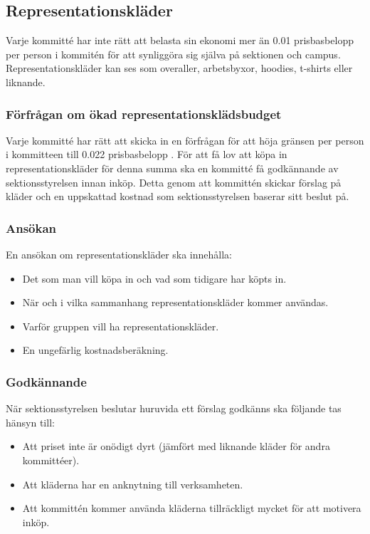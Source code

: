 \documentclass[a4paper]{dtek}
\newcommand{\prisbasbelopp}[1]{
    #1 prisbasbelopp
    \ifdef{\nuvarandeprisbasbelopp}{
        \marginpar{
            \small{ \textbf{\roundandprint{\xintiexpr#1 * \nuvarandeprisbasbelopp\relax}kr}}
        }
    }{}
}
\begin{document}
\subsection{Representationskläder}
Varje kommitté har inte rätt att belasta sin ekonomi mer än \prisbasbelopp{0.01} per person i kommitén
för att synliggöra sig själva på sektionen och campus. 
Representationskläder kan ses som overaller, arbetsbyxor, hoodies, t-shirts eller liknande.

\subsubsection{Förfrågan om ökad representationsklädsbudget}
Varje kommitté har rätt att skicka in en förfrågan för att höja gränsen
per person i kommitteen till \prisbasbelopp{0.022}.
För att få lov att köpa in representationskläder för denna summa ska en 
kommitté få godkännande av sektionsstyrelsen innan inköp. Detta genom att kommittén
skickar förslag på kläder och en uppskattad kostnad som sektionsstyrelsen baserar
sitt beslut på.

\subsubsection{Ansökan}
En ansökan om representationskläder ska innehålla:
\begin{itemize}
  \item Det som man vill köpa in och vad som tidigare har köpts in.
  \item När och i vilka sammanhang representationskläder kommer användas.
  \item Varför gruppen vill ha representationskläder.
  \item En ungefärlig kostnadsberäkning.
\end{itemize}

\subsubsection{Godkännande}
När sektionsstyrelsen beslutar huruvida ett förslag godkänns ska följande tas hänsyn till:
\begin{itemize}
    \item Att priset inte är onödigt dyrt (jämfört med liknande kläder för andra kommittéer).
    \item Att kläderna har en anknytning till verksamheten.
    \item Att kommittén kommer använda kläderna tillräckligt mycket för att motivera inköp.
\end{itemize}
\end{document}
